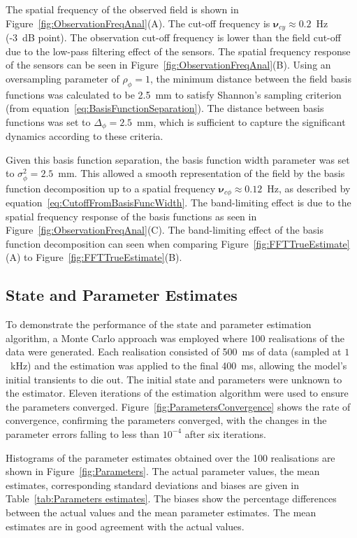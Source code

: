 \documentclass[10pt]{article}
\begin{document}
The spatial frequency of the observed field is shown in Figure~\ref{fig:ObservationFreqAnal}(A). The cut-off frequency is $\boldsymbol{\nu}_{cy} \approx 0.2$~Hz (-3~dB point). The observation cut-off frequency is lower than the field cut-off due to the low-pass filtering effect of the sensors. The spatial frequency response of the sensors can be seen in Figure~\ref{fig:ObservationFreqAnal}(B). Using an oversampling parameter of $\rho_{\phi}=1$, the minimum distance between the field basis functions was calculated to be 2.5~mm to satisfy Shannon's sampling criterion (from equation~\ref{eq:BasisFunctionSeparation}). The distance between basis functions was set to $\Delta_{\phi}=2.5$~mm, which is sufficient to capture the significant dynamics according to these criteria.

Given this basis function separation, the basis function width parameter was set to $\sigma_{\phi}^2=2.5$~mm. This allowed a smooth representation of the field by the basis function decomposition up to a spatial frequency $\boldsymbol{\nu}_{c\phi} \approx 0.12$~Hz, as described by equation~\ref{eq:CutoffFromBasisFuncWidth}. The band-limiting effect is due to the spatial frequency response of the basis functions as seen in Figure~\ref{fig:ObservationFreqAnal}(C). The band-limiting effect of the basis function decomposition can seen when comparing Figure~\ref{fig:FFTTrueEstimate}(A) to Figure~\ref{fig:FFTTrueEstimate}(B).

\subsection*{State and Parameter Estimates} 
\label{sec:state_and_param_results}
To demonstrate the performance of the state and parameter estimation algorithm, a Monte Carlo approach was employed where 100 realisations of the data were generated. Each realisation consisted of 500~ms of data (sampled at $1$~kHz) and the estimation was applied to the final 400~ms, allowing the model's initial transients to die out. The initial state and parameters were unknown to the estimator. Eleven iterations of the estimation algorithm were used to ensure the parameters  converged. Figure~\ref{fig:ParametersConvergence} shows the rate of convergence, confirming the parameters converged, with the changes in the parameter errors falling to less than $10^{-4}$ after six iterations.

Histograms of the parameter estimates obtained over the 100 realisations are shown in Figure~\ref{fig:Parameters}. The actual parameter values, the mean estimates, corresponding standard deviations and biases are given in Table~\ref{tab:Parameters estimates}. The biases show the percentage differences between the actual values and the mean parameter estimates. The mean estimates are in good agreement with the actual values.
\end{document}
